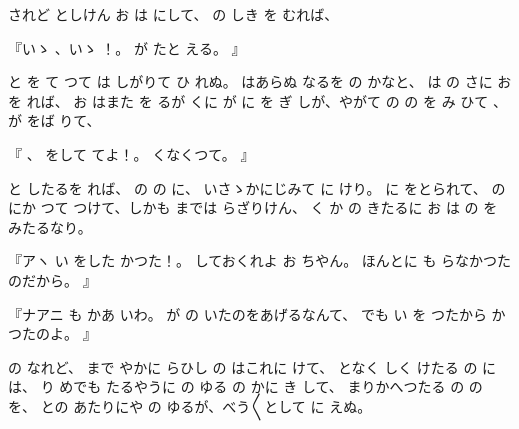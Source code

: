 されど
としけん
お
は
にして、
の
しき
を
むれば、

『いゝ
、いゝ
！。
が
たと
える。
』

と
を
て
つて
は
しがりて
ひ
れぬ。
はあらぬ
なるを
の
かなと、
は
の
さに
お
を
れば、
お
はまた
を
るが
くに
が
に
を
ぎ
しが、やがて
の
の
を
み
ひて
、
が
をば
りて、

『
、
をして
てよ！。
くなくつて。
』

と
したるを
れば、
の
の
に、
いさゝかにじみて
に
けり。
に
をとられて、
の
にか
つて
つけて、しかも
までは
らざりけん、
く
か
の
きたるに
お
は
の
を
みたるなり。

『アヽ
い
をした
かつた！。
しておくれよ%
お
ちやん。
ほんとに
も
らなかつたのだから。
』

『ナアニ
も
かあ
いわ。
が
の
いたのをあげるなんて、
でも
い
を
つたから
かつたのよ。
』

の
なれど、
まで
やかに
らひし
の
はこれに
けて、
となく
しく
けたる
の
には、
り
めでも
たるやうに
の
ゆる
の
かに
き
して、
まりかへつたる
の
の
を、
との
あたりにや
の
ゆるが、べう〳〵として
に
えぬ。

